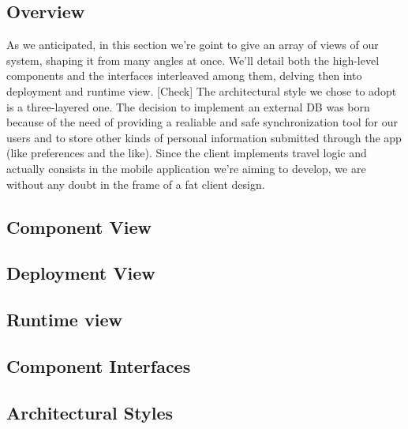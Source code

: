 \subsection{Overview}

	As we anticipated, in this section we’re goint to give an array of views of our system, shaping it from many angles at once. We’ll detail both the high-level components and the interfaces interleaved among them, delving then into deployment and runtime view.
	[Check] The architectural style we chose to adopt is a three-layered one.
	The decision to implement an external DB was born because of the need of providing a realiable and safe synchronization tool for our users and to store other kinds of personal information submitted through the app (like preferences and the like).
	Since the client implements travel logic and actually consists in the mobile application we’re aiming to develop, we are without any doubt in the frame of a fat client design.
	
\subsection{Component View}
	
	
\subsection{Deployment View}
	
\subsection{Runtime view}

\subsection{Component Interfaces}

\subsection{Architectural Styles}
	